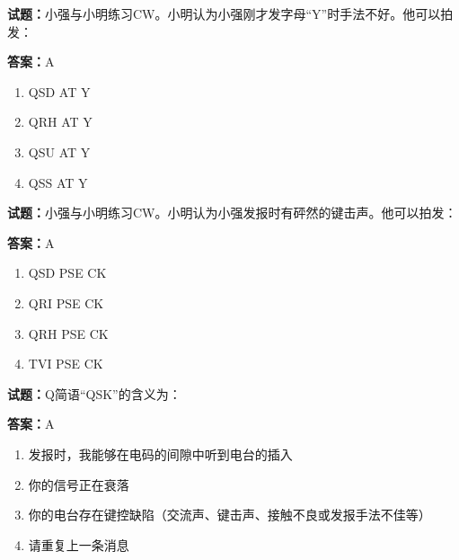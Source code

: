 \documentclass{ctexbook}
\begin{document}




\vspace{1em}

\textbf{试题：}小强与小明练习CW。小明认为小强刚才发字母“Y”时手法不好。他可以拍发： 

\textbf{答案：}A 

\begin{enumerate}[leftmargin=3em]
  \item QSD AT Y 

  \item QRH AT Y 

  \item QSU AT Y 

  \item QSS AT Y 

\end{enumerate}





\vspace{1em}

\textbf{试题：}小强与小明练习CW。小明认为小强发报时有砰然的键击声。他可以拍发： 

\textbf{答案：}A 

\begin{enumerate}[leftmargin=3em]
  \item QSD PSE CK 

  \item QRI PSE CK 

  \item QRH PSE CK 

  \item TVI PSE CK 

\end{enumerate}





\vspace{1em}

\textbf{试题：}Q简语“QSK”的含义为： 

\textbf{答案：}A 

\begin{enumerate}[leftmargin=3em]
  \item 发报时，我能够在电码的间隙中听到电台的插入 

  \item 你的信号正在衰落 

  \item 你的电台存在键控缺陷（交流声、键击声、接触不良或发报手法不佳等） 

  \item 请重复上一条消息 

\end{enumerate}
\end{document}

